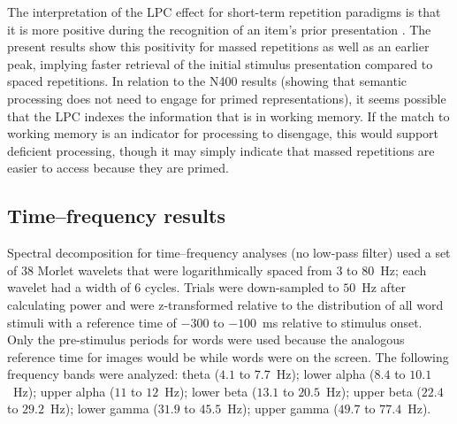 The interpretation of the LPC effect for short-term repetition paradigms is that it is more positive during the recognition of an item's prior presentation \cite{OlicEtal2000,VanSEtal2007}.  The present results show this positivity for massed repetitions as well as an earlier peak, implying faster retrieval of the initial stimulus presentation compared to spaced repetitions.
In relation to the N400 results (showing that semantic processing does not need to engage for primed representations), it seems possible that the LPC indexes the information that is in working memory.  If the match to working memory is an indicator for processing to disengage, this would support deficient processing, though it may simply indicate that massed repetitions are easier to access because they are primed.


\subsection{Time--frequency results}

Spectral decomposition for time--frequency analyses (no low-pass filter) used a set of $38$ Morlet wavelets that were logarithmically spaced from $3$ to $80$~Hz; each wavelet had a width of $6$ cycles.  Trials were down-sampled to $50$~Hz after calculating power and were z-transformed relative to the distribution of all word stimuli with a reference time of $-300$ to $-100$~ms relative to stimulus onset.
Only the pre-stimulus periods for words were used because the analogous reference time for images would be while words were on the screen.
The following frequency bands were analyzed: theta ($4.1$ to $7.7$~Hz); lower alpha ($8.4$ to $10.1$~Hz); upper alpha ($11$ to $12$~Hz); lower beta ($13.1$ to $20.5$~Hz); upper beta ($22.4$ to $29.2$~Hz); lower gamma ($31.9$ to $45.5$~Hz); upper gamma ($49.7$ to $77.4$~Hz).

